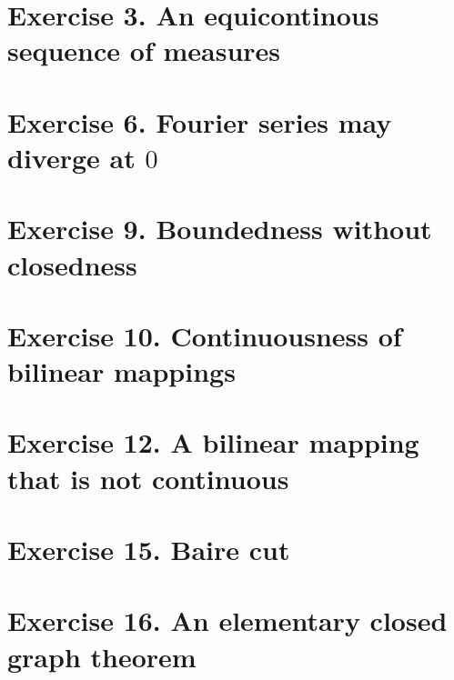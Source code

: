 %
\setcounter{section}{2}
%

\section{Exercise 3. An equicontinous sequence of measures}

\newpage
%
\setcounter{section}{5}
%
\section{Exercise 6. Fourier series may diverge at $0$}

\newpage
%
\setcounter{section}{8}
%
\section{Exercise 9. Boundedness without closedness}

\newpage
%
\section{Exercise 10. Continuousness of bilinear mappings}

\newpage
%
\setcounter{section}{11}
%
\section{Exercise 12. A bilinear mapping that is not continuous}

\newpage
%
\setcounter{section}{14}
%
\section{Exercise 15. Baire cut}

\newpage
%
\section{Exercise 16. An elementary closed graph theorem}
